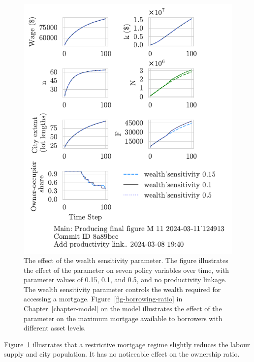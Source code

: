 \begin{figure}[h!bt]
    \centering
    \includegraphics[scale=1, trim={0 1.4cm 0 0},clip]{fig/wealth_sensitivity-124913.pdf}
    \caption[The effect of the wealth sensitivity parameter]{The effect of the wealth sensitivity parameter. The figure illustrates the effect of the parameter on seven policy variables over time, with parameter values of 0.15, 0.1, and 0.5, and no productivity linkage. The wealth sensitivity parameter controls the wealth required for accessing a mortgage.  Figure~\ref{fig-borrowing-ratio} in Chapter~\ref{chapter-model} on the model illustrates the effect of the parameter on the maximum mortgage available to borrowers with different asset levels.}
    \label{fig:wealth_sensitivity_ownership_trajectory}
\end{figure}

Figure~\ref{fig:wealth_sensitivity_ownership_trajectory} illustrates that a restrictive mortgage regime slightly reduces the labour supply and city population. It has no noticeable effect on the ownership ratio. %

